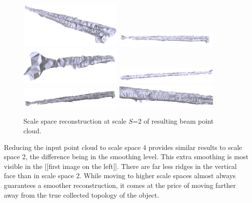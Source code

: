 \documentclass[12pt]{drexelthesis}
\begin{document}
\begin{figure}[!ht]
	\centering
		\includegraphics[width=2in]{real-lab-scans/meshed/scalespace200.png}
		\includegraphics[width=2in]{real-lab-scans/meshed/scalespace201.png}
		\includegraphics[width=2in]{real-lab-scans/meshed/scalespace202.png}
		\includegraphics[width=2in]{real-lab-scans/meshed/scalespace203.png}
		\includegraphics[width=2in]{real-lab-scans/meshed/scalespace204.png}
		\includegraphics[width=2in]{real-lab-scans/meshed/scalespace205.png}
		\caption[Scale space reconstruction at scale $S$=2 of segmented LiDAR data]{\centering Scale space reconstruction at scale $S$=2 of resulting beam point cloud.}
	\label{lidar:scalespace2}
\end{figure}

Reducing the input point cloud to scale space 4 provides similar results to scale space 2, the difference being in the smoothing level. This extra smoothing is most visible in the [[first image on the left]]. There are far less ridges in the vertical face than in scale space 2. While moving to higher scale spaces almost always guarantees a smoother reconstruction, it comes at the price of moving farther away from the true collected topology of the object.
\end{document}
